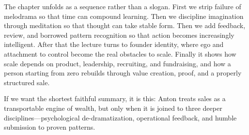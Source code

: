 The chapter unfolds as a sequence rather than a slogan. First we strip failure of melodrama so that time can compound learning. Then we discipline imagination through meditation so that thought can take stable form. Then we add feedback, review, and borrowed pattern recognition so that action becomes increasingly intelligent. After that the lecture turns to founder identity, where ego and attachment to control become the real obstacles to scale. Finally it shows how scale depends on product, leadership, recruiting, and fundraising, and how a person starting from zero rebuilds through value creation, proof, and a properly structured sale.

If we want the shortest faithful summary, it is this: Anton treats sales as a transportable engine of wealth, but only when it is joined to three deeper disciplines---psychological de-dramatization, operational feedback, and humble submission to proven patterns.